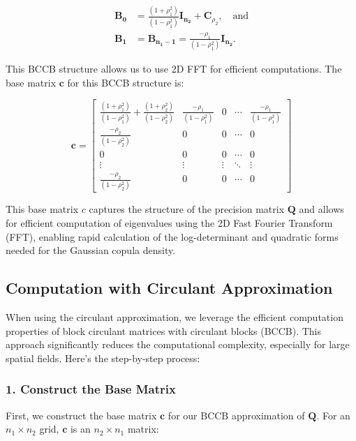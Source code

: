 \documentclass[journal=,manuscript=]{achemso}
\begin{document}
\[
\begin{aligned}
\mathbf{B_0} &= \frac{(1+\rho_1^2)}{(1 - \rho_1^2)}\mathbf{I_{n_2}} + \mathbf C_{\rho_2}, \quad \text{and} \\
\mathbf{B_1} &= \mathbf{B_{n_1 - 1}} = \frac{-\rho_1}{(1 - \rho_1^2)}\mathbf{I_{n_2}}.
\end{aligned}
\]

This BCCB structure allows us to use 2D FFT for efficient computations.
The base matrix \(\mathbf c\) for this BCCB structure is:

\[
\mathbf{c} = \begin{bmatrix}
\frac{(1+\rho_1^2)}{(1 - \rho_1^2)} + \frac{(1+\rho_2^2)}{(1 - \rho_2^2)} & \frac{-\rho_1}{(1 - \rho_1^2)} & 0 & \cdots  & \frac{-\rho_1}{(1 - \rho_1^2)} \\
\frac{-\rho_2}{(1 - \rho_2^2)} & 0 & 0 & \cdots  & 0 \\
0 & 0 & 0 & \cdots  & 0 \\
\vdots & \vdots & \vdots & \ddots &  \vdots \\
\frac{-\rho_2}{(1 - \rho_2^2)} & 0 & 0 & \cdots  & 0
\end{bmatrix}
\]

This base matrix \(c\) captures the structure of the precision matrix
\(\mathbf Q\) and allows for efficient computation of eigenvalues using
the 2D Fast Fourier Transform (FFT), enabling rapid calculation of the
log-determinant and quadratic forms needed for the Gaussian copula
density.

\subsection{Computation with Circulant
Approximation}\label{computation-with-circulant-approximation}

When using the circulant approximation, we leverage the efficient
computation properties of block circulant matrices with circulant blocks
(BCCB). This approach significantly reduces the computational
complexity, especially for large spatial fields. Here's the step-by-step
process:

\subsubsection{1. Construct the Base
Matrix}\label{construct-the-base-matrix}

First, we construct the base matrix \(\mathbf c\) for our BCCB
approximation of \(\mathbf Q\). For an \(n_1 \times n_2\) grid,
\(\mathbf c\) is an \(n_2 \times n_1\) matrix:
\end{document}
